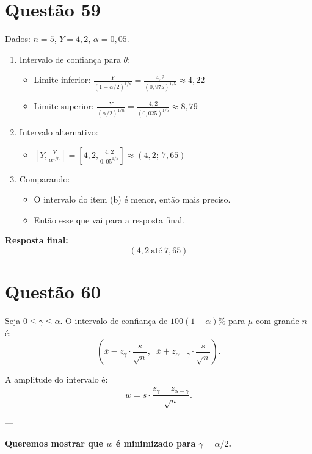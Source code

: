\documentclass[12pt]{article}
\newcommand{\quest}[1]{\section*{Questão #1}} %
\begin{document}
\quest{59}

Dados: $n = 5$, $Y = 4{,}2$, $\alpha = 0{,}05$.

\begin{enumerate}
    \item Intervalo de confiança para $\theta$:
    \begin{itemize}
        \item Limite inferior: $\displaystyle \frac{Y}{(1 - \alpha/2)^{1/n}} = \frac{4{,}2}{(0{,}975)^{1/5}} \approx 4{,}22$
        \item Limite superior: $\displaystyle \frac{Y}{(\alpha/2)^{1/n}} = \frac{4{,}2}{(0{,}025)^{1/5}} \approx 8{,}79$
    \end{itemize}

    \item Intervalo alternativo:
    \begin{itemize}
        \item $\left[ Y, \frac{Y}{\alpha^{1/n}} \right] = \left[ 4{,}2, \frac{4{,}2}{0{,}05^{1/5}} \right] \approx (4{,}2;\ 7{,}65)$
    \end{itemize}

    \item Comparando:
    \begin{itemize}
        \item O intervalo do item (b) é menor, então mais preciso.
        \item Então esse que vai para a resposta final.
    \end{itemize}
\end{enumerate}

\textbf{Resposta final:}
\[
\boxed{(4{,}2\ \text{até}\ 7{,}65)}
\]

\quest{60}

Seja \(0 \leq \gamma \leq \alpha\). O intervalo de confiança de \(100(1-\alpha)\%\) para \(\mu\) com grande \(n\) é:
\[
\left(\overline{x} - z_{\gamma} \cdot \frac{s}{\sqrt{n}}, \;\; \overline{x} + z_{\alpha - \gamma} \cdot \frac{s}{\sqrt{n}}\right).
\]

A amplitude do intervalo é:
\[
w = s \cdot \frac{z_{\gamma} + z_{\alpha - \gamma}}{\sqrt{n}}.
\]

---

\textbf{Queremos mostrar que \(w\) é minimizado para \(\gamma = \alpha/2\).}
\end{document}
